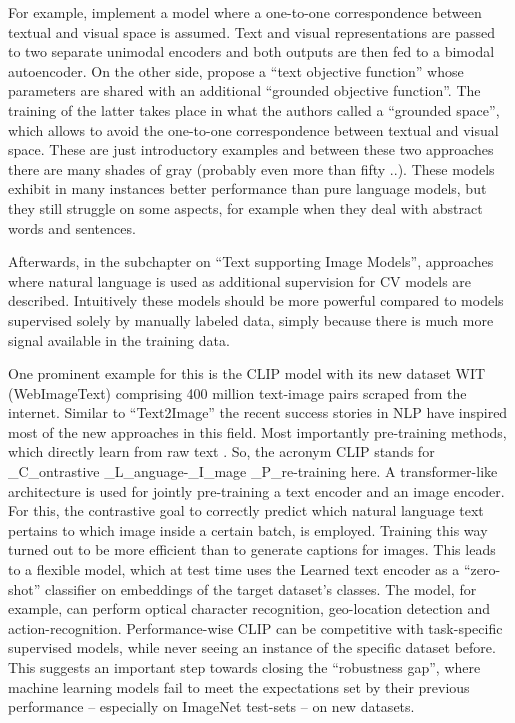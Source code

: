 \documentclass[
]{krantz}
\begin{document}
For example, \citet{silberer2014learning} implement a model where a one-to-one correspondence between textual and visual space is assumed.
Text and visual representations are passed to two separate unimodal encoders and both outputs are then fed to a bimodal autoencoder.
On the other side, \citet{bordes2020incorporating} propose a ``text objective function'' whose parameters are shared with an additional ``grounded objective function''.
The training of the latter takes place in what the authors called a ``grounded space'', which allows to avoid the one-to-one correspondence between textual and visual space.
These are just introductory examples and between these two approaches there are many shades of gray (probably even more than fifty ..).
These models exhibit in many instances better performance than pure language models, but they still struggle on some aspects, for example when they deal with abstract words and sentences.

Afterwards, in the subchapter on ``Text supporting Image Models'', approaches where natural language is used as additional supervision for CV models are described.
Intuitively these models should be more powerful compared to models supervised solely by manually labeled data, simply because there is much more signal available in the training data.

One prominent example for this is the CLIP model \citep{radford2021learning} with its new dataset WIT (WebImageText) comprising 400 million text-image pairs scraped from the internet.
Similar to ``Text2Image'' the recent success stories in NLP have inspired most of the new approaches in this field.
Most importantly pre-training methods, which directly learn from raw text \citep[e.g.~GPT-n, Generative Pre-trained Transformer;][]{brown2020language}.
So, the acronym CLIP stands for \_C\_ontrastive \_L\_anguage-\_I\_mage \_P\_re-training here.
A transformer-like architecture is used for jointly pre-training a text encoder and an image encoder.
For this, the contrastive goal to correctly predict which natural language text pertains to which image inside a certain batch, is employed.
Training this way turned out to be more efficient than to generate captions for images.
This leads to a flexible model, which at test time uses the Learned text encoder as a ``zero-shot'' classifier on embeddings of the target dataset's classes.
The model, for example, can perform optical character recognition, geo-location detection and action-recognition.
Performance-wise CLIP can be competitive with task-specific supervised models, while never seeing an instance of the specific dataset before.
This suggests an important step towards closing the ``robustness gap'', where machine learning models fail to meet the expectations set by their previous performance -- especially on ImageNet test-sets -- on new datasets.
\end{document}
